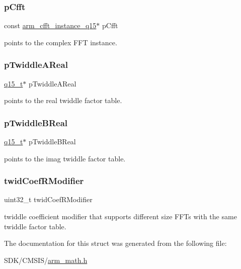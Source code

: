 \subsubsection{\texorpdfstring{p\+Cfft}{pCfft}}
{\footnotesize\ttfamily const \mbox{\hyperlink{structarm__cfft__instance__q15}{arm\+\_\+cfft\+\_\+instance\+\_\+q15}}$\ast$ p\+Cfft}

points to the complex F\+FT instance. \mbox{\label{structarm__rfft__instance__q15_ac17beaa033ab1ea242d49037276b67e2}} 
\subsubsection{\texorpdfstring{p\+Twiddle\+A\+Real}{pTwiddleAReal}}
{\footnotesize\ttfamily \mbox{\hyperlink{arm__math_8h_ab5a8fb21a5b3b983d5f54f31614052ea}{q15\+\_\+t}}$\ast$ p\+Twiddle\+A\+Real}

points to the real twiddle factor table. \mbox{\label{structarm__rfft__instance__q15_a67a618de57c3a7420ee05fda1a80bf3a}} 
\subsubsection{\texorpdfstring{p\+Twiddle\+B\+Real}{pTwiddleBReal}}
{\footnotesize\ttfamily \mbox{\hyperlink{arm__math_8h_ab5a8fb21a5b3b983d5f54f31614052ea}{q15\+\_\+t}}$\ast$ p\+Twiddle\+B\+Real}

points to the imag twiddle factor table. \mbox{\label{structarm__rfft__instance__q15_a5b06f7f76c018db993fe6acc5708c589}} 
\subsubsection{\texorpdfstring{twid\+Coef\+R\+Modifier}{twidCoefRModifier}}
{\footnotesize\ttfamily uint32\+\_\+t twid\+Coef\+R\+Modifier}

twiddle coefficient modifier that supports different size F\+F\+Ts with the same twiddle factor table. 

The documentation for this struct was generated from the following file\+:\begin{DoxyCompactItemize}
\item 
S\+D\+K/\+C\+M\+S\+I\+S/\mbox{\hyperlink{arm__math_8h}{arm\+\_\+math.\+h}}\end{DoxyCompactItemize}

